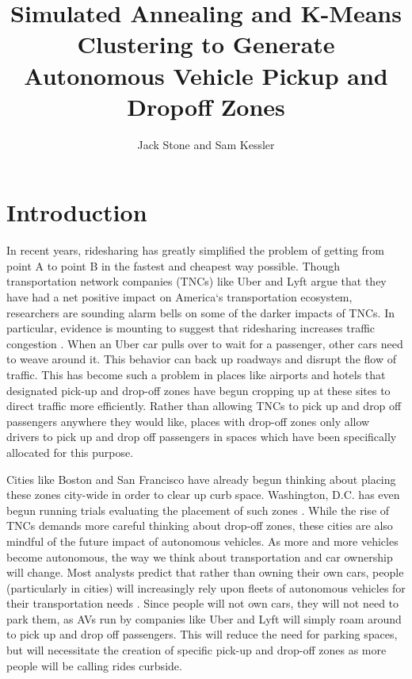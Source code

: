 \documentclass[11pt]{article}
\title{Simulated Annealing and K-Means Clustering to Generate Autonomous Vehicle Pickup and Dropoff Zones}
\author{Jack Stone and Sam Kessler}
\begin{document}
\maketitle{}


\section{Introduction}

In recent years, ridesharing has greatly simplified the problem of getting from point A to point B in the fastest and cheapest way possible. Though transportation network companies (TNCs) like Uber and Lyft argue that they have had a net positive impact on America`s transportation ecosystem, researchers are sounding alarm bells on some of the darker impacts of TNCs. In particular, evidence is mounting to suggest that ridesharing increases traffic congestion \cite{oecd}. When an Uber car pulls over to wait for a passenger, other cars need to weave around it. This behavior can back up roadways and disrupt the flow of traffic. This has become such a problem in places like airports and hotels that designated pick-up and drop-off zones have begun cropping up at these sites to direct traffic more efficiently. Rather than allowing TNCs to pick up and drop off passengers anywhere they would like, places with drop-off zones only allow drivers to pick up and drop off passengers in spaces which have been specifically allocated for this purpose.

Cities like Boston and San Francisco have already begun thinking  about placing these zones city-wide in order to clear up curb space. Washington, D.C. has even begun running trials evaluating the placement of such zones \cite{oecd}. While the rise of TNCs demands more careful thinking about drop-off zones, these cities are also mindful of the future impact of autonomous vehicles. As more and more vehicles become autonomous, the way we think about transportation and car ownership will change. Most analysts predict that rather than owning their own cars, people (particularly in cities) will increasingly rely upon fleets of autonomous vehicles for their transportation needs \cite{fleets}. Since people will not own cars, they will not need to park them, as AVs run by companies like Uber and Lyft will simply roam around to pick up and drop off passengers. This will reduce the need for parking spaces, but will necessitate the creation of specific pick-up and drop-off zones as more people will be calling rides curbside.
\end{document}

